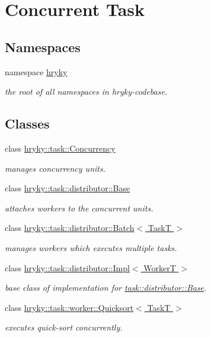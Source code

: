 \hypertarget{group__task}{\section{Concurrent Task}
\label{group__task}
}
\subsection*{Namespaces}
\begin{DoxyCompactItemize}
\item 
namespace \hyperlink{namespacehryky}{hryky}
\begin{DoxyCompactList}\small\item\em the root of all namespaces in hryky-\/codebase. \end{DoxyCompactList}\end{DoxyCompactItemize}
\subsection*{Classes}
\begin{DoxyCompactItemize}
\item 
class \hyperlink{classhryky_1_1task_1_1_concurrency}{hryky\-::task\-::\-Concurrency}
\begin{DoxyCompactList}\small\item\em manages concurrency units. \end{DoxyCompactList}\item 
class \hyperlink{classhryky_1_1task_1_1distributor_1_1_base}{hryky\-::task\-::distributor\-::\-Base}
\begin{DoxyCompactList}\small\item\em attaches workers to the concurrent units. \end{DoxyCompactList}\item 
class \hyperlink{classhryky_1_1task_1_1distributor_1_1_batch}{hryky\-::task\-::distributor\-::\-Batch$<$ Task\-T $>$}
\begin{DoxyCompactList}\small\item\em manages workers which executes multiple tasks. \end{DoxyCompactList}\item 
class \hyperlink{classhryky_1_1task_1_1distributor_1_1_impl}{hryky\-::task\-::distributor\-::\-Impl$<$ Worker\-T $>$}
\begin{DoxyCompactList}\small\item\em base class of implementation for \hyperlink{classhryky_1_1task_1_1distributor_1_1_base}{task\-::distributor\-::\-Base}. \end{DoxyCompactList}\item 
class \hyperlink{classhryky_1_1task_1_1worker_1_1_quicksort}{hryky\-::task\-::worker\-::\-Quicksort$<$ Task\-T $>$}
\begin{DoxyCompactList}\small\item\em executes quick-\/sort concurrently. \end{DoxyCompactList}\end{DoxyCompactItemize}
